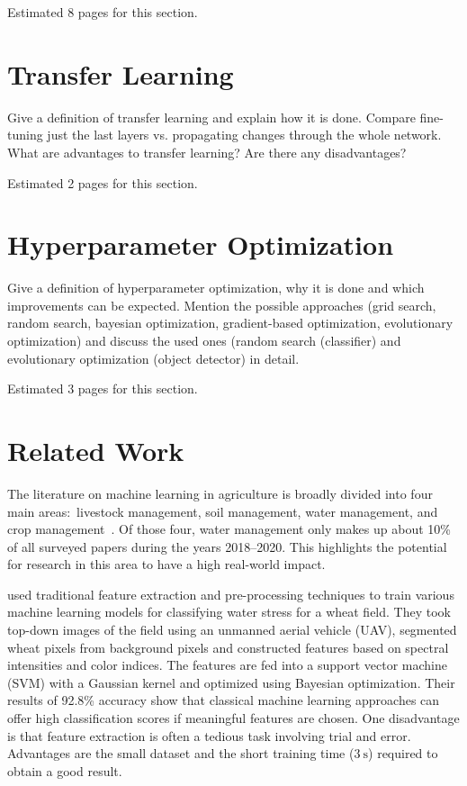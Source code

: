 \documentclass[draft,final]{vutinfth} %
\begin{document}
Estimated 8 pages for this section.

\section{Transfer Learning}
\label{sec:background-transfer-learning}

Give a definition of transfer learning and explain how it is
done. Compare fine-tuning just the last layers vs. propagating changes
through the whole network. What are advantages to transfer learning?
Are there any disadvantages?

Estimated 2 pages for this section.

\section{Hyperparameter Optimization}
\label{sec:background-hypopt}

Give a definition of hyperparameter optimization, why it is done and
which improvements can be expected. Mention the possible approaches
(grid search, random search, bayesian optimization, gradient-based
optimization, evolutionary optimization) and discuss the used ones
(random search (classifier) and evolutionary optimization (object
detector) in detail.

Estimated 3 pages for this section.

\section{Related Work}
\label{sec:related-work}

The literature on machine learning in agriculture is broadly divided
into four main areas:~livestock management, soil management, water
management, and crop management~\cite{benos2021}. Of those four, water
management only makes up about 10\% of all surveyed papers during the
years 2018--2020. This highlights the potential for research in this
area to have a high real-world impact.

\textcite{su2020} used traditional feature extraction and
pre-processing techniques to train various machine learning models for
classifying water stress for a wheat field. They took top-down images
of the field using an unmanned aerial vehicle (UAV), segmented wheat
pixels from background pixels and constructed features based on
spectral intensities and color indices. The features are fed into a
support vector machine (SVM) with a Gaussian kernel and optimized
using Bayesian optimization. Their results of 92.8\% accuracy show
that classical machine learning approaches can offer high
classification scores if meaningful features are chosen. One
disadvantage is that feature extraction is often a tedious task
involving trial and error. Advantages are the small dataset and the
short training time ($\qty{3}{\second}$) required to obtain a good
result.
\end{document}
